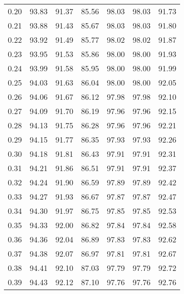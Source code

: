 \begin{tabular}{|c|c|c|c|c|c|c|}
      0.20 &     93.83 &     91.37 &      85.56 &   98.03 &      98.03 &         91.73 \\
      0.21 &     93.88 &     91.43 &      85.67 &   98.03 &      98.03 &         91.80 \\
      0.22 &     93.92 &     91.49 &      85.77 &   98.02 &      98.02 &         91.87 \\
      0.23 &     93.95 &     91.53 &      85.86 &   98.00 &      98.00 &         91.93 \\
      0.24 &     93.99 &     91.58 &      85.95 &   98.00 &      98.00 &         91.99 \\
      0.25 &     94.03 &     91.63 &      86.04 &   98.00 &      98.00 &         92.05 \\
      0.26 &     94.06 &     91.67 &      86.12 &   97.98 &      97.98 &         92.10 \\
      0.27 &     94.09 &     91.70 &      86.19 &   97.96 &      97.96 &         92.15 \\
      0.28 &     94.13 &     91.75 &      86.28 &   97.96 &      97.96 &         92.21 \\
      0.29 &     94.15 &     91.77 &      86.35 &   97.93 &      97.93 &         92.26 \\
      0.30 &     94.18 &     91.81 &      86.43 &   97.91 &      97.91 &         92.31 \\
      0.31 &     94.21 &     91.86 &      86.51 &   97.91 &      97.91 &         92.37 \\
      0.32 &     94.24 &     91.90 &      86.59 &   97.89 &      97.89 &         92.42 \\
      0.33 &     94.27 &     91.93 &      86.67 &   97.87 &      97.87 &         92.47 \\
      0.34 &     94.30 &     91.97 &      86.75 &   97.85 &      97.85 &         92.53 \\
      0.35 &     94.33 &     92.00 &      86.82 &   97.84 &      97.84 &         92.58 \\
      0.36 &     94.36 &     92.04 &      86.89 &   97.83 &      97.83 &         92.62 \\
      0.37 &     94.38 &     92.07 &      86.97 &   97.81 &      97.81 &         92.67 \\
      0.38 &     94.41 &     92.10 &      87.03 &   97.79 &      97.79 &         92.72 \\
      0.39 &     94.43 &     92.12 &      87.10 &   97.76 &      97.76 &         92.76 \\

\end{tabular}

